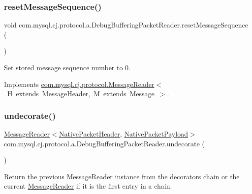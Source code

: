 \subsubsection{\texorpdfstring{reset\+Message\+Sequence()}{resetMessageSequence()}}
{\footnotesize\ttfamily void com.\+mysql.\+cj.\+protocol.\+a.\+Debug\+Buffering\+Packet\+Reader.\+reset\+Message\+Sequence (\begin{DoxyParamCaption}{ }\end{DoxyParamCaption})}

Set stored message sequence number to 0. 

Implements \mbox{\hyperlink{interfacecom_1_1mysql_1_1cj_1_1protocol_1_1_message_reader_a3161e55ab8c1bb4d533aa6d2700fb14d}{com.\+mysql.\+cj.\+protocol.\+Message\+Reader$<$ H extends Message\+Header, M extends Message $>$}}.

\mbox{\label{classcom_1_1mysql_1_1cj_1_1protocol_1_1a_1_1_debug_buffering_packet_reader_a9e51a1437df97c27971470ee4df5ab83}} 
\subsubsection{\texorpdfstring{undecorate()}{undecorate()}}
{\footnotesize\ttfamily \mbox{\hyperlink{interfacecom_1_1mysql_1_1cj_1_1protocol_1_1_message_reader}{Message\+Reader}}$<$\mbox{\hyperlink{classcom_1_1mysql_1_1cj_1_1protocol_1_1a_1_1_native_packet_header}{Native\+Packet\+Header}}, \mbox{\hyperlink{classcom_1_1mysql_1_1cj_1_1protocol_1_1a_1_1_native_packet_payload}{Native\+Packet\+Payload}}$>$ com.\+mysql.\+cj.\+protocol.\+a.\+Debug\+Buffering\+Packet\+Reader.\+undecorate (\begin{DoxyParamCaption}{ }\end{DoxyParamCaption})}

Return the previous \mbox{\hyperlink{interfacecom_1_1mysql_1_1cj_1_1protocol_1_1_message_reader}{Message\+Reader}} instance from the decorators chain or the current \mbox{\hyperlink{interfacecom_1_1mysql_1_1cj_1_1protocol_1_1_message_reader}{Message\+Reader}} if it is the first entry in a chain.

